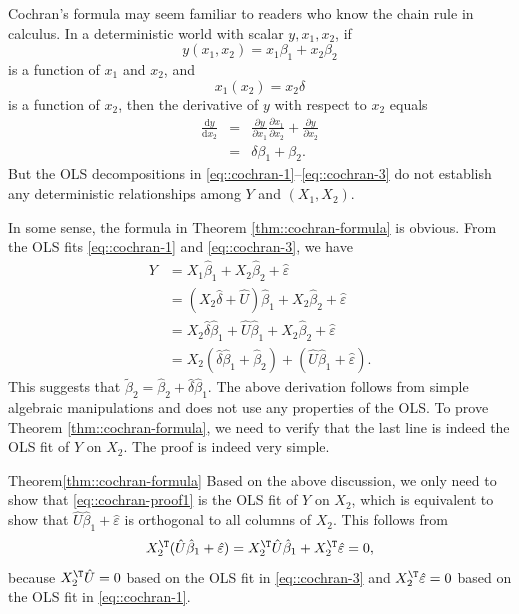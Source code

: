 Cochran's formula may seem familiar to readers who know the chain rule in calculus. In a deterministic world with scalar $y, x_1, x_2$, if
$$
y(x_1, x_2) = x_1  \beta_1 + x_2  \beta_2
$$
is a function of $x_1$ and $x_2$, 
and
$$
x_1(x_2) = x_2  \delta
$$
is a function of $x_2$, 
then the derivative of $y$ with respect to $x_2$ equals 
\begin{eqnarray*}
\frac{  \text{d} y }{  \text{d}x_2 } 
&=&   \frac{  \partial y }{ \partial x_1 }   \frac{  \partial x_1 }{ \partial x_2 }  + \frac{  \partial y }{ \partial x_2 }  \\
&=&  \delta   \beta_1 + \beta_2. 
\end{eqnarray*}
But the OLS decompositions in \eqref{eq::cochran-1}--\eqref{eq::cochran-3} do not establish any deterministic relationships among $Y$ and $(X_1, X_2)$. 


 In some sense, the formula in Theorem \ref{thm::cochran-formula} is obvious. From the OLS fits \eqref{eq::cochran-1} and \eqref{eq::cochran-3}, we have
\begin{align} 
Y & =X_{1}\hat{\beta}_{1}+X_{2}\hat{\beta}_{2}+\hat{\varepsilon}  \nonumber  \\
 & =(X_{2}\hat{\delta}+\hat{U})\hat{\beta}_{1}+X_{2}\hat{\beta}_{2}+\hat{\varepsilon}  \nonumber\\
 & =X_{2}\hat{\delta}\hat{\beta}_{1}+\hat{U}\hat{\beta}_{1}+X_{2}\hat{\beta}_{2}+\hat{\varepsilon}  \nonumber\\
 & =X_{2}(\hat{\delta}\hat{\beta}_{1}+\hat{\beta}_{2})+(\hat{U}\hat{\beta}_{1}+\hat{\varepsilon}).
 \label{eq::cochran-proof1}
\end{align} 
This suggests that $\tilde{\beta}_{2}=\hat{\beta}_{2}+\hat{\delta}\hat{\beta}_{1}$. The above derivation follows from simple algebraic manipulations and does not use any properties of the OLS. To prove Theorem \ref{thm::cochran-formula}, we need to verify that the last line is indeed the OLS fit of $Y$ on $X_2.$ The proof is indeed very simple. 
 
 
 \begin{myproof}{Theorem}{\ref{thm::cochran-formula}}
Based on the above discussion, 
we only need to show that \eqref{eq::cochran-proof1} is the OLS fit of $Y$
on $X_{2}$, which is equivalent to show that $\hat{U}\hat{\beta}_{1}+\hat{\varepsilon}$
is orthogonal to all columns of $X_{2}.$ This follows from
\[
X_{2}^{\T}(\hat{U}\hat{\beta}_{1}+\hat{\varepsilon})=X_{2}^{\T}\hat{U}\hat{\beta}_{1}+X_{2}^{\T}\hat{\varepsilon}=0,
\]
because $X_{2}^{\T}\hat{U}=0$ based on the OLS fit in \eqref{eq::cochran-3} and $X_{2}^{\T}\hat{\varepsilon}=0$
based on the OLS fit in \eqref{eq::cochran-1}. 
\end{myproof}



